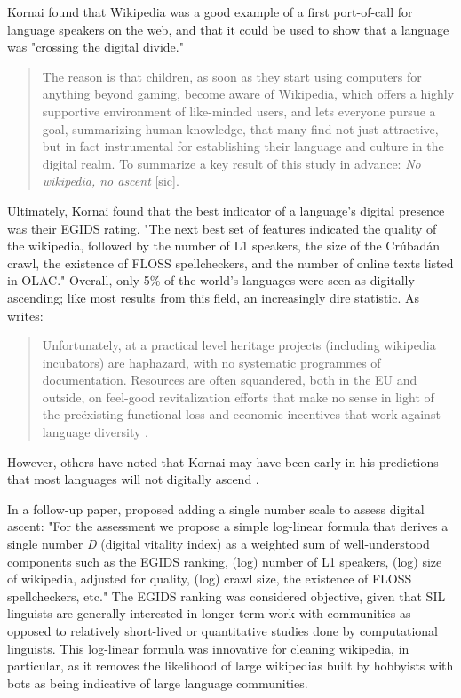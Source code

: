 Kornai found that Wikipedia was a good example of a first port-of-call for language speakers on the web, and that it could be used to show that a language was "crossing the digital divide."

\begin{quote}
The reason is that children, as soon as they start using computers for anything beyond gaming, become aware of Wikipedia, which offers a highly supportive environment of like-minded users, and lets everyone pursue a goal, summarizing human knowledge, that many find not just attractive, but in fact instrumental for establishing their language and culture in the digital realm. To summarize a key result of this study in advance: \emph{No wikipedia, no ascent} [sic]. \citep{kornai2013digital}
\end{quote}

Ultimately, Kornai found that the best indicator of a language's digital presence was their EGIDS rating. "The next best set of features indicated the quality of the wikipedia, followed by the number of L1 speakers, the size of the Cr\'ubad\'an crawl, the existence of FLOSS spellcheckers, and the number of online texts listed in OLAC." \citep[6]{kornai2013digital} Overall, only 5\% of the world's languages were seen as digitally ascending; like most results from this field, an increasingly dire statistic. As \citet[10]{kornai2013digital} writes:

\begin{quote}
Unfortunately, at a practical level heritage projects (including wiki\-pedia incubators) are haphazard, with no systematic programmes of documentation. Resources are often squandered, both in the EU and outside, on feel-good revitalization efforts that make no sense in light of the pre\"{e}xisting functional loss and economic incentives that work against language diversity \citep{ginsburgh2011many}.
\end{quote}

However, others have noted that Kornai may have been early in his predictions that most languages will not digitally ascend \citep{gibson2016assessing}.

In a follow-up paper, \citep{kornai2015new} proposed adding a single number scale to assess digital ascent: "For the assessment we propose a simple log-linear formula that derives a single number {\emph D} (digital vitality index) as a weighted sum of well-understood components such as the EGIDS ranking, (log) number of L1 speakers, (log) size of wikipedia, adjusted for quality, (log) crawl size, the existence of FLOSS spellcheckers, etc." The EGIDS ranking was considered objective, given that SIL linguists are generally interested in longer term work with communities as opposed to relatively short-lived or quantitative studies done by computational linguists. This log-linear formula was innovative for cleaning wikipedia, in particular, as it removes the likelihood of large wikipedias built by hobbyists with bots as being indicative of large language communities.

